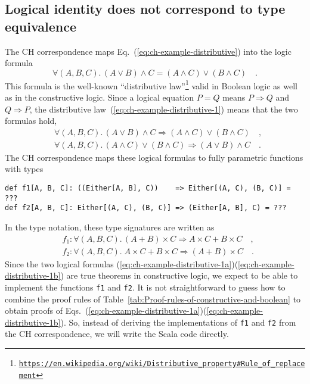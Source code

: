 \subsection{Logical identity does not correspond to type equivalence\label{subsec:Logical-identity-not-type-equivalence}}

The CH correspondence maps Eq.~(\ref{eq:ch-example-distributive})
into the logic formula
\begin{equation}
\forall(A,B,C).\,\left(A\vee B\right)\wedge C=\left(A\wedge C\right)\vee\left(B\wedge C\right)\quad.\label{eq:ch-example-distributive-1}
\end{equation}
This formula is the well-known ``distributive law''\footnote{\texttt{\href{https://en.wikipedia.org/wiki/Distributive_property\#Rule_of_replacement}{https://en.wikipedia.org/wiki/Distributive\_property\#Rule\_of\_replacement}}}
valid in Boolean logic as well as in the constructive logic. Since
a logical equation $P=Q$ means $P\Rightarrow Q$ and $Q\Rightarrow P$,
the distributive law~(\ref{eq:ch-example-distributive-1}) means
that the two formulas hold,
\begin{align}
 & \forall(A,B,C).\,\left(A\vee B\right)\wedge C\Rightarrow\left(A\wedge C\right)\vee\left(B\wedge C\right)\quad,\label{eq:ch-example-distributive-1a}\\
 & \forall(A,B,C).\,\left(A\wedge C\right)\vee\left(B\wedge C\right)\Rightarrow\left(A\vee B\right)\wedge C\quad.\label{eq:ch-example-distributive-1b}
\end{align}
The CH correspondence maps these logical formulas to fully parametric
functions with types
\begin{lstlisting}
def f1[A, B, C]: ((Either[A, B], C))    => Either[(A, C), (B, C)] = ???
def f2[A, B, C]: Either[(A, C), (B, C)] => (Either[A, B], C) = ???
\end{lstlisting}
In the type notation, these type signatures are written as
\begin{align*}
 & f_{1}:\forall(A,B,C).\,\left(A+B\right)\times C\Rightarrow A\times C+B\times C\quad,\\
 & f_{2}:\forall(A,B,C).\;A\times C+B\times C\Rightarrow\left(A+B\right)\times C\quad.
\end{align*}
Since the two logical formulas (\ref{eq:ch-example-distributive-1a})\textendash (\ref{eq:ch-example-distributive-1b})
are true theorems in constructive logic, we expect to be able to implement
the functions \lstinline!f1! and \lstinline!f2!. It is not straightforward
to guess how to combine the proof rules of Table~\ref{tab:Proof-rules-of-constructive-and-boolean}
to obtain proofs of Eqs.~(\ref{eq:ch-example-distributive-1a})\textendash (\ref{eq:ch-example-distributive-1b}).
So, instead of deriving the implementations of \lstinline!f1! and
\lstinline!f2! from the CH correspondence, we will write the Scala
code directly.

